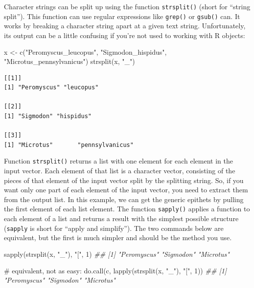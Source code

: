 \documentclass[
  13,
  letterpaper,
]{report}
\newenvironment{Shaded}{\begin{snugshade}}{\end{snugshade}}
\newcommand{\CommentTok}[1]{\textcolor[rgb]{0.37,0.37,0.37}{#1}}
\newcommand{\DecValTok}[1]{\textcolor[rgb]{0.68,0.00,0.00}{#1}}
\newcommand{\DocumentationTok}[1]{\textcolor[rgb]{0.37,0.37,0.37}{\textit{#1}}}
\newcommand{\FunctionTok}[1]{\textcolor[rgb]{0.28,0.35,0.67}{#1}}
\newcommand{\NormalTok}[1]{\textcolor[rgb]{0.00,0.23,0.31}{#1}}
\newcommand{\OtherTok}[1]{\textcolor[rgb]{0.00,0.23,0.31}{#1}}
\newcommand{\StringTok}[1]{\textcolor[rgb]{0.13,0.47,0.30}{#1}}
\begin{document}
Character strings can be split up using the function \texttt{strsplit()}
(short for ``string split''). This function can use regular expressions
like \texttt{grep()} or \texttt{gsub()} can. It works by breaking a
character string apart at a given text string. Unfortunately, its output
can be a little confusing if you're not used to working with R objects:

\begin{Shaded}
\begin{Highlighting}[]
\NormalTok{x }\OtherTok{\textless{}{-}} \FunctionTok{c}\NormalTok{(}\StringTok{"Peromyscus\_leucopus"}\NormalTok{,}
       \StringTok{"Sigmodon\_hispidus"}\NormalTok{,}
       \StringTok{"Microtus\_pennsylvanicus"}\NormalTok{)}
\FunctionTok{strsplit}\NormalTok{(x, }\StringTok{"\_"}\NormalTok{)}
\end{Highlighting}
\end{Shaded}

\begin{verbatim}
[[1]]
[1] "Peromyscus" "leucopus"  

[[2]]
[1] "Sigmodon" "hispidus"

[[3]]
[1] "Microtus"       "pennsylvanicus"
\end{verbatim}

Function \texttt{strsplit()} returns a list with one element for each
element in the input vector. Each element of that list is a character
vector, consisting of the pieces of that element of the input vector
split by the splitting string. So, if you want only one part of each
element of the input vector, you need to extract them from the output
list. In this example, we can get the generic epithets by pulling the
first element of each list element. The function \texttt{sapply()}
applies a function to each element of a list and returns a result with
the simplest possible structure (\texttt{sapply} is short for ``apply
and simplify''). The two commands below are equivalent, but the first is
much simpler and should be the method you use.

\begin{Shaded}
\begin{Highlighting}[]
\FunctionTok{sapply}\NormalTok{(}\FunctionTok{strsplit}\NormalTok{(x, }\StringTok{"\_"}\NormalTok{), }\StringTok{"["}\NormalTok{, }\DecValTok{1}\NormalTok{)}
\DocumentationTok{\#\# [1] "Peromyscus" "Sigmodon"   "Microtus"}

\CommentTok{\# equivalent, not as easy:}
\FunctionTok{do.call}\NormalTok{(c, }\FunctionTok{lapply}\NormalTok{(}\FunctionTok{strsplit}\NormalTok{(x, }\StringTok{"\_"}\NormalTok{), }\StringTok{"["}\NormalTok{, }\DecValTok{1}\NormalTok{))}
\DocumentationTok{\#\# [1] "Peromyscus" "Sigmodon"   "Microtus"}
\end{Highlighting}
\end{Shaded}
\end{document}
